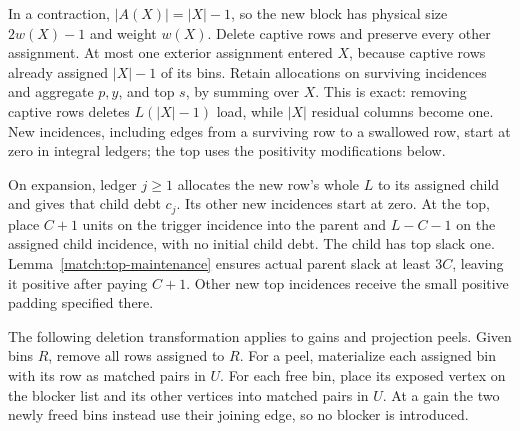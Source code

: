 In a contraction, \(|A(X)|=|X|-1\), so the new block has physical
size \(2w(X)-1\) and weight \(w(X)\).  Delete captive rows and preserve
every other assignment.  At most one exterior assignment entered
\(X\), because captive rows already assigned \(|X|-1\) of its bins.
Retain allocations on surviving incidences and aggregate \(p,y\),
and top \(s\), by summing over \(X\).  This is exact: removing captive
rows deletes \(L(|X|-1)\) load, while \(|X|\) residual columns become
one.  New incidences, including edges from a surviving row to a
swallowed row, start at zero in integral ledgers; the top uses the
positivity modifications below.

On expansion, ledger \(j\ge1\) allocates the new row's whole \(L\)
to its assigned child and gives that child debt \(c_j\).
Its other new incidences start at zero.  At the top, place \(C+1\)
units on the trigger incidence into the parent and \(L-C-1\) on
the assigned child incidence, with no initial child debt.
The child has top slack one.  Lemma~\ref{match:top-maintenance}
ensures actual parent slack at least \(3C\), leaving it positive
after paying \(C+1\).  Other new top incidences receive the small
positive padding specified there.

The following deletion transformation applies to gains and projection
peels.  Given bins \(R\), remove all rows assigned to \(R\).
For a peel, materialize each assigned bin with its row as matched
pairs in \(U\).  For each free bin, place its exposed vertex on the
blocker list and its other vertices into matched pairs in \(U\).
At a gain the two newly freed bins instead use their joining edge,
so no blocker is introduced.


